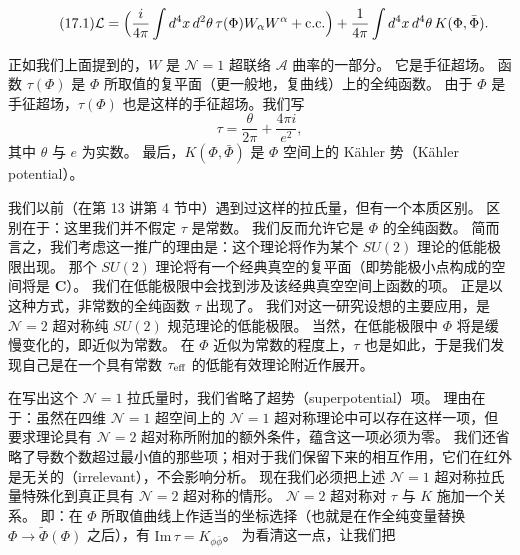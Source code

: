 \begin{equation}
  \tag{17.1}
  \label{eq:17-1}
  \mathcal{L}=\Bigl(\frac{i}{4\pi}\int d^4x\,d^2\theta\,\tau(\Phi)W_\alpha W^\alpha+\text{c.c.}\Bigr)
  +\frac{1}{4\pi}\int d^4x\,d^4\theta\,K(\Phi,\bar\Phi).
\end{equation}

正如我们上面提到的，$W$ 是 $\mathcal{N}=1$ 超联络 $\mathcal{A}$ 曲率的一部分。
它是手征超场。
函数 $\tau(\Phi)$ 是 $\Phi$ 所取值的复平面（更一般地，复曲线）上的全纯函数。
由于 $\Phi$ 是手征超场，$\tau(\Phi)$ 也是这样的手征超场。我们写
\[
\tau=\frac{\theta}{2\pi}+\frac{4\pi i}{e^2},
\]
其中 $\theta$ 与 $e$ 为实数。
最后，$K(\Phi,\bar\Phi)$ 是 $\Phi$ 空间上的 Kähler 势（Kähler potential）。

我们以前（在第 13 讲第 4 节中）遇到过这样的拉氏量，但有一个本质区别。
区别在于：这里我们并不假定 $\tau$ 是常数。
我们反而允许它是 $\Phi$ 的全纯函数。
简而言之，我们考虑这一推广的理由是：这个理论将作为某个 $SU(2)$ 理论的低能极限出现。
那个 $SU(2)$ 理论将有一个经典真空的复平面（即势能极小点构成的空间将是 $\mathbf{C}$）。
我们在低能极限中会找到涉及该经典真空空间上函数的项。
正是以这种方式，非常数的全纯函数 $\tau$ 出现了。
我们对这一研究设想的主要应用，是 $\mathcal{N}=2$ 超对称纯 $SU(2)$ 规范理论的低能极限。
当然，在低能极限中 $\Phi$ 将是缓慢变化的，即近似为常数。
在 $\Phi$ 近似为常数的程度上，$\tau$ 也是如此，于是我们发现自己是在一个具有常数 $\tau_{\rm eff}$ 的低能有效理论附近作展开。


在写出这个 $\mathcal{N}=1$ 拉氏量时，我们省略了超势（superpotential）项。
理由在于：虽然在四维 $\mathcal{N}=1$ 超空间上的 $\mathcal{N}=1$ 超对称理论中可以存在这样一项，但要求理论具有 $\mathcal{N}=2$ 超对称所附加的额外条件，蕴含这一项必须为零。
我们还省略了导数个数超过最小值的那些项；相对于我们保留下来的相互作用，它们在红外是无关的（irrelevant），不会影响分析。
现在我们必须把上述 $\mathcal{N}=1$ 超对称拉氏量特殊化到真正具有 $\mathcal{N}=2$ 超对称的情形。
$\mathcal{N}=2$ 超对称对 $\tau$ 与 $K$ 施加一个关系。
即：在 $\Phi$ 所取值曲线上作适当的坐标选择（也就是在作全纯变量替换 $\Phi\to\tilde\Phi(\Phi)$ 之后），有 $\mathrm{Im}\,\tau=K_{\phi\bar\phi}$。
为看清这一点，让我们把

